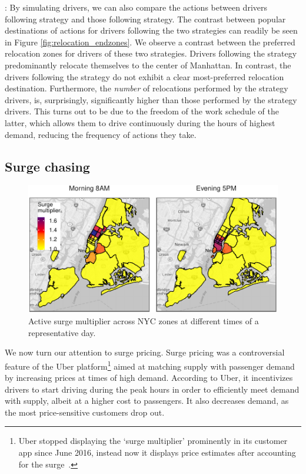 : By simulating drivers, we can also compare the {\relocate} actions between drivers following {\relocation} strategy and those following {\relocationflexible} strategy. The contrast between popular destinations 
of {\relocate} actions for drivers following the two strategies can readily be seen in Figure \ref{fig:relocation_endzones}. 
We observe a contrast between the preferred relocation zones for drivers of these two strategies. 
Drivers following the {\relocation} strategy predominantly relocate themselves to the center of Manhattan. In contrast, the drivers following the {\relocationflexible} strategy do not exhibit a clear most-preferred relocation destination. Furthermore, the 
{\em number} of relocations performed by the {\relocation} strategy drivers, 
is, surprisingly, significantly higher than those performed by the {\relocationflexible} strategy drivers. 
This turns out to be due to the freedom of the work schedule of the latter, which allows them to drive 
  continuously during the hours of highest demand, reducing the frequency of {\relocate} actions they take. 

\subsection{Surge chasing}
\begin{figure}
	\centering
	\includegraphics{figures/surge_heatmap.pdf}
	\caption{Active surge multiplier across NYC zones at different times of a representative day.}
	\label{fig:surge_heatmap}
\end{figure}

We now turn our attention to surge pricing. Surge pricing was a controversial feature of the Uber platform\footnote{Uber stopped displaying the `surge multiplier' prominently in its customer app since June 2016, instead now it displays price estimates after accounting for the surge~\cite{surge}.} 
aimed at matching supply with passenger demand by increasing prices at times of high demand. 
According to Uber, it incentivizes drivers to start driving during the peak hours in order to efficiently meet demand with 
  supply, albeit at a higher cost to passengers.
It also decreases demand, as the most price-sensitive customers drop out. 

